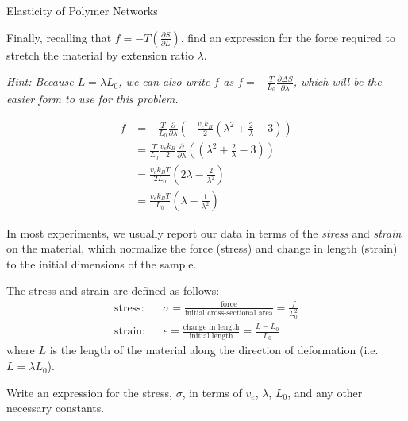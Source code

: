\begin{activity}{Elasticity of Polymer Networks}
\begin{ctqs}
	\question Finally, recalling that $f = -T\left(\frac{\partial S}{\partial L}\right)$, find an expression for the force required to stretch the material by extension ratio $\lambda$.
	
		\emph{Hint: Because $L = \lambda L_0$, we can also write $f$ as $f = -\frac{T}{L_0}\frac{\partial \Delta S}{\partial \lambda}$, which will be the easier form to use for this problem.}
		
			\begin{solution}[2.5in]
			
				\begin{align*}
					f &= -\frac{T}{L_0}\frac{\partial}{\partial \lambda} \left(-\frac{v_e k_B}{2}\left(\lambda^2 + \frac{2}{\lambda} - 3\right)\right)\\
						&= \frac{T}{L_0}\frac{v_e k_B}{2}\frac{\partial}{\partial \lambda} \left(\left(\lambda^2 + \frac{2}{\lambda} - 3\right)\right)\\
						&= \frac{v_e k_B T}{2 L_0}\left(2\lambda - \frac{2}{\lambda^2} \right)\\
						&= \frac{v_e k_B T}{L_0}\left(\lambda - \frac{1}{\lambda^2} \right)
				\end{align*}
			\end{solution}
	
\end{ctqs}

\begin{model}

	In most experiments, we usually report our data in terms of the \emph{stress} and \emph{strain} on the material, which normalize the force (stress) and change in length (strain) to the initial dimensions of the sample.
	
	The stress and strain are defined as follows:
	\begin{align*}
		\text{stress:} && \sigma = \frac{\text{force}}{\text{initial cross-sectional area}} = \frac{f}{L_0^2} \\
		\text{strain:} && \epsilon = \frac{\text{change in length}}{\text{initial length}} = \frac{L-L_0}{L_0}
	\end{align*}
	where $L$ is the length of the material along the direction of deformation (i.e. $L = \lambda L_0$).
	
\end{model}

\begin{ctqs}

	\question Write an expression for the stress, $\sigma$, in terms of $v_e$, $\lambda$, $L_0$, and any other necessary constants.
	

\end{ctqs}
\end{activity}
